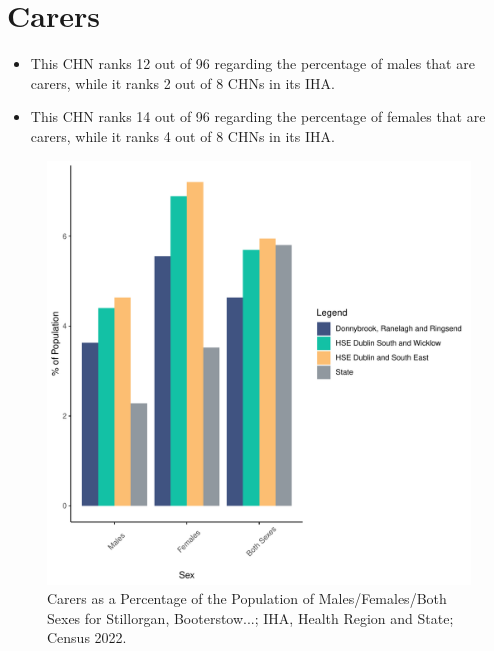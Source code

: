 \documentclass{article}
\begin{document}
\section{Carers}\label{sect:Carers}
\begin{itemize}
\item This CHN ranks  12 out of 96 regarding the percentage of males that are carers, while it ranks   2 out of 8 CHNs in its IHA.
\item This CHN ranks  14 out of 96 regarding the percentage of females that are carers, while it ranks   4 out of 8 CHNs in its IHA.
\end{itemize}
\begin{figure}[H]
	\centering
	\includegraphics[width = 150mm]{../figures/CareED.pdf}
	\caption{Carers as a Percentage of the Population of Males/Females/Both Sexes for Stillorgan, Booterstow...; IHA, Health Region and State; Census 2022.}
	\label{fig:2ae19629-1a6a-13a3-e055-000000000001}
	\end{figure}
\end{document}
